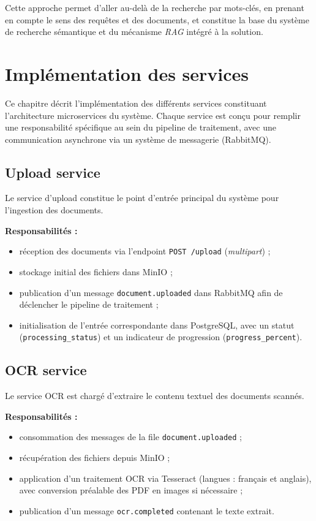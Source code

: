 \documentclass[12pt,a4paper]{report}
\begin{document}
Cette approche permet d’aller au-delà de la recherche par mots-clés, en prenant en compte le sens des requêtes et des documents, et constitue la base du système de recherche sémantique et du mécanisme \textit{RAG} intégré à la solution.

\chapter{Implémentation des services}
\noindent Ce chapitre décrit l’implémentation des différents services constituant l’architecture microservices du système. Chaque service est conçu pour remplir une responsabilité spécifique au sein du pipeline de traitement, avec une communication asynchrone via un système de messagerie (RabbitMQ).

\section{Upload service}
Le service d’upload constitue le point d’entrée principal du système pour l’ingestion des documents.

\textbf{Responsabilités :}
\begin{itemize}
  \item réception des documents via l’endpoint \texttt{POST /upload} (\textit{multipart}) ;
  \item stockage initial des fichiers dans MinIO ;
  \item publication d’un message \texttt{document.uploaded} dans RabbitMQ afin de déclencher le pipeline de traitement ;
  \item initialisation de l’entrée correspondante dans PostgreSQL, avec un statut (\texttt{processing\_status}) et un indicateur de progression (\texttt{progress\_percent}).
\end{itemize}

\section{OCR service}
Le service OCR est chargé d’extraire le contenu textuel des documents scannés.

\textbf{Responsabilités :}
\begin{itemize}
  \item consommation des messages de la file \texttt{document.uploaded} ;
  \item récupération des fichiers depuis MinIO ;
  \item application d’un traitement OCR via Tesseract (langues : français et anglais), avec conversion préalable des PDF en images si nécessaire ;
  \item publication d’un message \texttt{ocr.completed} contenant le texte extrait.
\end{itemize}
\end{document}
